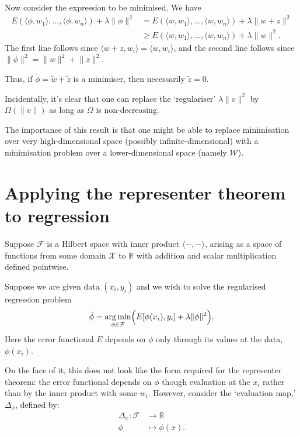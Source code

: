 \documentclass[11pt]{article}
\begin{document}
Now consider the expression to be minimised. We have
\begin{equation}
\begin{aligned}
E(\langle\phi, w_1\rangle, \dotsc, \langle\phi, w_n\rangle) +
\lambda \lVert \phi \rVert^2 
&= 
E(\langle w, w_1\rangle, \dotsc, \langle w, w_n\rangle) +
\lambda \lVert w + z \rVert^2 \\
&\geq 
E(\langle w, w_1\rangle, \dotsc, \langle w, w_n\rangle) +
\lambda \lVert w \rVert^2.
 \end{aligned}
\end{equation}
The first line follows since \(\langle w + z, w_i\rangle = \langle w, w_i\rangle\),
and the second line follows since \(\lVert \phi \rVert^2 = \lVert w \rVert^2 +
\lVert z \rVert^2\).

Thus, if \(\tilde{\phi} = \tilde{w} + \tilde{z}\) is a minimiser, then necessarily
\(\tilde{z}=0\).

Incidentally, it's clear that one can replace the `regulariser' \(\lambda\lVert
v\rVert^2\) by \(\Omega(\lVert v\rVert)\) as long as \(\Omega\) is non-decreasing.

The importance of this result is that one might be able to replace minimisation
over very high-dimensional space (possibly infinite-dimensional) with a
minimisation problem over a lower-dimensional space (namely \(\mathcal{W}\)).

\section{Applying the representer theorem to regression}
\label{sec:orgcdca334}

Suppose \(\mathcal{F}\) is a Hilbert space with inner product \(\langle -,-
\rangle\), arising as a space of functions from some domain \(\mathcal{X}\) to
\(\mathbb{R}\) with addition and scalar multiplication defined pointwise.

Suppose we are given data \((x_i, y_i)\) and we wish to solve the regularised
regression problem
\begin{equation}
\tilde{\phi} = 
\operatorname*{arg\,min}_{\phi\in\mathcal{F}} \Bigl( E[\phi(x_i), y_i] + \lambda\lVert \phi\rVert^2 \Bigr).
\end{equation}
Here the error functional \(E\) depends on \(\phi\) only through its values at the
data, \(\phi(x_i)\).  

On the face of it, this does not look like the form required for the representer
theorem: the error functional depends on \(\phi\) though evaluation at the \(x_i\)
rather than by the inner product with some \(w_i\). However, consider the
`evaluation map,' \(\Delta_x\), defined by:
\begin{equation}
\begin{aligned}
\Delta_x : \mathcal{F} &\to \mathbb{R} \\
           \phi        &\mapsto \phi(x).
\end{aligned}
\end{equation}
\end{document}
